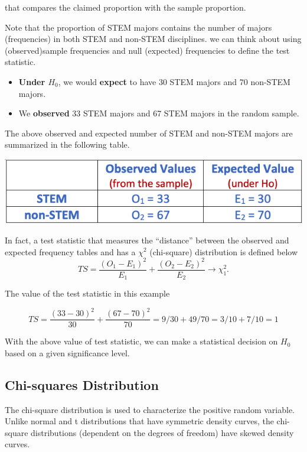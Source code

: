 \documentclass[
]{article}
\begin{document}
that compares the claimed proportion with the sample proportion.

Note that the proportion of STEM majors contains the number of majors
(frequencies) in both STEM and non-STEM disciplines. we can think about
using (observed)sample frequencies and null (expected) frequencies to
define the test statistic.

\begin{itemize}
\item
  \textbf{Under \(H_0\)}, we would \textbf{expect} to have 30 STEM
  majors and 70 non-STEM majors.
\item
  We \textbf{observed} 33 STEM majors and 67 STEM majors in the random
  sample.
\end{itemize}

The above observed and expected number of STEM and non-STEM majors are
summarized in the following table.

\begin{center}\includegraphics[width=0.5\linewidth]{week13/example01-ExpObsTable} \end{center}

In fact, a test statistic that measures the ``distance'' between the
observed and expected frequency tables and has a \(\chi^2\) (chi-square)
distribution is defined below \[
TS = \frac{(O_1 - E_1)^2}{E_1} + \frac{(O_2 - E_2)^2}{E_2} \to \chi_1^2.
\]

The value of the test statistic in this example

\[TS = \frac{(33-30)^2}{30} + \frac{(67-70)^2}{70} = 9/30 + 49/70 = 3/10 + 7/10 = 1\]

With the above value of test statistic, we can make a statistical
decision on \(H_0\) based on a given significance level.

\hypertarget{chi-squares-distribution}{%
\subsection{Chi-squares Distribution}\label{chi-squares-distribution}}

The chi-square distribution is used to characterize the positive random
variable. Unlike normal and t distributions that have symmetric density
curves, the chi-square distributions (dependent on the degrees of
freedom) have skewed density curves.
\end{document}
